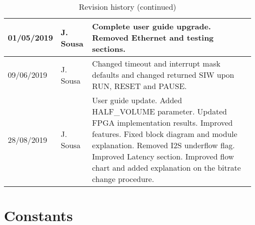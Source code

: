 \documentclass{rep}
\theoremstyle{plain}
\begin{document}
\begin{table}[H]
\begin{center}
\begin{tabular}{|l|l|p{8cm}|}
     01/05/2019 & J. Sousa & Complete user guide upgrade. Removed Ethernet and
     testing sections.\\ \hline

     \rowcolor{iob-blue} 09/06/2019 & J. Sousa & Changed timeout and interrupt
     mask defaults and changed returned SIW upon RUN, RESET and PAUSE.\\ \hline

     28/08/2019 & J. Sousa & User guide update. Added HALF\_VOLUME
     parameter. Updated FPGA implementation results. Improved features. Fixed
     block diagram and module explanation. Removed I2S underflow flag. Improved
     Latency section. Improved flow chart and added explanation on the bitrate
     change procedure.\\ \hline

    \end{tabular}
    \caption{Revision history (continued)}
  \end{center}
\end{table}
\clearpage




\section*{Constants}
\end{document}
